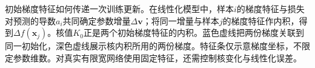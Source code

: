 初始梯度特征如何传递一次训练更新。在线性化模型中，样本$i$的梯度特征与损失对预测的导数$a_i$共同确定参数增量$\Delta\bm v$；将同一增量与样本$j$的梯度特征作内积，得到$\Delta f(\bm x_j)$。核值$K_0$正是两个初始梯度特征的内积。蓝色虚线把两份梯度关联到同一初始化，深色虚线展示核内积所用的两份梯度。特征条仅示意梯度坐标，不限定参数维数。对真实有限宽网络使用固定特征，还需控制核变化与线性化误差。
